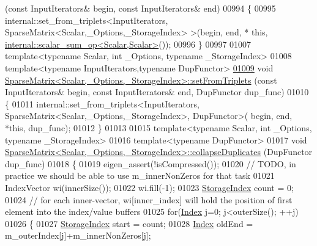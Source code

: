 \begin{DoxyCode}
      (\textcolor{keyword}{const} InputIterators& begin, \textcolor{keyword}{const} InputIterators& end)
00994 \{
00995   internal::set\_from\_triplets<InputIterators, SparseMatrix<Scalar,\_Options,\_StorageIndex> >(begin, end, *\textcolor{keyword}{
      this}, \hyperlink{struct_eigen_1_1internal_1_1scalar__sum__op}{internal::scalar\_sum\_op<Scalar,Scalar>}());
00996 \}
00997 
01007 \textcolor{keyword}{template}<\textcolor{keyword}{typename} Scalar, \textcolor{keywordtype}{int} \_Options, \textcolor{keyword}{typename} \_StorageIndex>
01008 \textcolor{keyword}{template}<\textcolor{keyword}{typename} InputIterators,\textcolor{keyword}{typename} DupFunctor>
\hyperlink{group___sparse_core___module_ad3eee2d3d2a9843cd095c0207f781e7e}{01009} \textcolor{keywordtype}{void} \hyperlink{group___sparse_core___module_acc35051d698e3973f1de5b9b78dbe345}{SparseMatrix<Scalar,\_Options,\_StorageIndex>::setFromTriplets}
      (\textcolor{keyword}{const} InputIterators& begin, \textcolor{keyword}{const} InputIterators& end, DupFunctor dup\_func)
01010 \{
01011   internal::set\_from\_triplets<InputIterators, SparseMatrix<Scalar,\_Options,\_StorageIndex>, DupFunctor>(
      begin, end, *\textcolor{keyword}{this}, dup\_func);
01012 \}
01013 
01015 \textcolor{keyword}{template}<\textcolor{keyword}{typename} Scalar, \textcolor{keywordtype}{int} \_Options, \textcolor{keyword}{typename} \_StorageIndex>
01016 \textcolor{keyword}{template}<\textcolor{keyword}{typename} DupFunctor>
01017 \textcolor{keywordtype}{void} \hyperlink{group___sparse_core___module_class_eigen_1_1_sparse_matrix}{SparseMatrix<Scalar,\_Options,\_StorageIndex>::collapseDuplicates}
      (DupFunctor dup\_func)
01018 \{
01019   eigen\_assert(!isCompressed());
01020   \textcolor{comment}{// TODO, in practice we should be able to use m\_innerNonZeros for that task}
01021   IndexVector wi(innerSize());
01022   wi.fill(-1);
01023   \hyperlink{group___sparse_core___module_a0b540ba724726ebe953f8c0df06081ed}{StorageIndex} count = 0;
01024   \textcolor{comment}{// for each inner-vector, wi[inner\_index] will hold the position of first element into the index/value
       buffers}
01025   \textcolor{keywordflow}{for}(\hyperlink{group___core___module_a554f30542cc2316add4b1ea0a492ff02}{Index} j=0; j<outerSize(); ++j)
01026   \{
01027     \hyperlink{group___sparse_core___module_a0b540ba724726ebe953f8c0df06081ed}{StorageIndex} start   = count;
01028     \hyperlink{group___core___module_a554f30542cc2316add4b1ea0a492ff02}{Index} oldEnd  = m\_outerIndex[j]+m\_innerNonZeros[j];

\end{DoxyCode}
